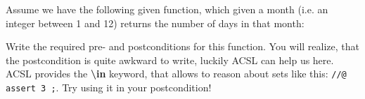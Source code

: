 Assume we have the following given function, which given a month (i.e. an integer between 1 and 12) returns the number of days in that month:


Write the required pre- and postconditions for this function. You will realize, that the postcondition is quite awkward to write, luckily ACSL can help us here. ACSL provides the \textbf{\textbackslash in} keyword, that allows to reason about sets like this: \texttt{//@ assert 3 ;}. Try using it in your postcondition! 
